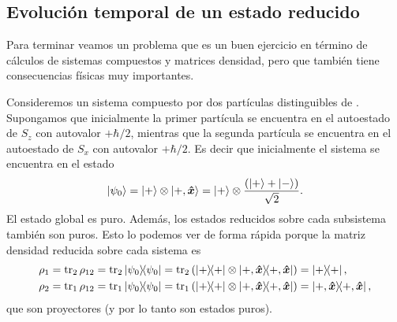 \documentclass[10pt, a4paper]{article}
\numberwithin{equation}{subsection}
\begin{document}
\subsection{Evolución temporal de un estado reducido}
Para terminar veamos un problema que es un buen ejercicio en término de
cálculos de sistemas compuestos y matrices densidad, pero que también tiene
consecuencias físicas muy importantes.

Consideremos un sistema compuesto por dos partículas distinguibles de
\spinhalf. Supongamos que inicialmente la primer partícula se encuentra en el
autoestado de $S_z$ con autovalor $+\hbar/2$, mientras que la segunda partícula
se encuentra en el autoestado de $S_x$ con autovalor $+\hbar/2$. Es decir que
inicialmente el sistema se encuentra en el estado
\begin{equation}
  \ket{\psi_0} = \ket{+}\otimes\ket{+,\vu*{x}} =
  \ket{+}\otimes\frac{\left(\ket{+} + \ket{-}\right)}{\sqrt{2}}.
\end{equation}
El estado global es puro. Además, los estados reducidos sobre cada subsistema
también son puros. Esto lo podemos ver de forma rápida porque la matriz
densidad reducida sobre cada sistema es
\begin{align}
  \rho_{1} &= \tr_2\rho_{12} = \tr_2\projector{\psi_0} =
    \tr_2\left(\projector{+}\tensor\projector{+,\vers{x}}\right) =
    \projector{+}, \\
  \rho_{2} &= \tr_1\rho_{12} = \tr_1\projector{\psi_0} =
    \tr_1\left(\projector{+}\tensor\projector{+,\vers{x}}\right) =
    \projector{+,\vers{x}},
\end{align}
que son proyectores (y por lo tanto son estados puros).
\end{document}
